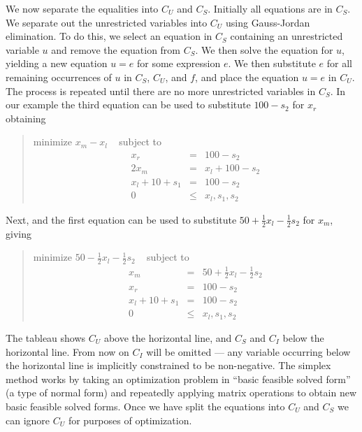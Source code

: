 \documentclass{article}
\begin{document}
We now separate the equalities into $C_U$ and $C_S$\@.
Initially all equations are in $C_S$\@.  We separate out the
unrestricted variables into $C_U$ using Gauss-Jordan elimination.  To do
this, we select an equation in $C_S$ containing an unrestricted variable
$u$ and remove the equation
from $C_S$\@.  We then solve the equation for $u$, yielding
a new equation $u=e$ for some expression $e$.  We then substitute $e$ for
all remaining occurrences of $u$ in $C_S$, $C_U$, and $f$,
and place the equation $u=e$ in
$C_U$\@.  The process is repeated until there are no more unrestricted
variables in $C_S$\@.  In our example the third equation can be used to
substitute $100 - s_2$ for $x_r$ 
obtaining
\begin{quote}\vspace*{-1ex}
minimize $x_m - x_l$ 
~ subject to
$$
\begin{array}{rcl}
x_r &= & 100 - s_2 \\ \hline
2 x_m & = & x_l + 100 - s_2 \\
x_l + 10 + s_1& = & 100 - s_2 \\
0 &\leq & x_l, s_1, s_2
\end{array}
$$
\end{quote}\vspace{-0.9ex}
Next, 
and the first equation can be used to 
substitute $50 + \frac{1}{2}x_l - \frac{1}{2} s_2$ 
for $x_m$, giving 
\begin{quote}\vspace*{-1ex}
minimize $50 - \frac{1}{2}x_l - \frac{1}{2} s_2$ 
~ subject to 
$$
\begin{array}{rcl}
x_m & = & 50 + \frac{1}{2} x_l - \frac{1}{2} s_2 \\ 
x_r &= & 100 - s_2 \\ \hline
x_l + 10 + s_1& = &100 - s_2 \\
0 &\leq & x_l, s_1, s_2
\end{array}
$$
\end{quote}\vspace{-0.9ex}
The tableau shows $C_U$ above the horizontal line,
and $C_S$ and $C_I$ below the horizontal line.  From now 
on $C_I$ will be omitted --- any variable occurring below the horizontal
line is implicitly constrained to be non-negative.
The simplex method works by taking an optimization problem in ``basic
feasible solved form'' (a type of normal form) and repeatedly applying
matrix operations to obtain new basic feasible solved forms.  Once we
have split the equations into $C_U$ and $C_S$ we can ignore $C_U$ for
purposes of optimization. 
\end{document}
